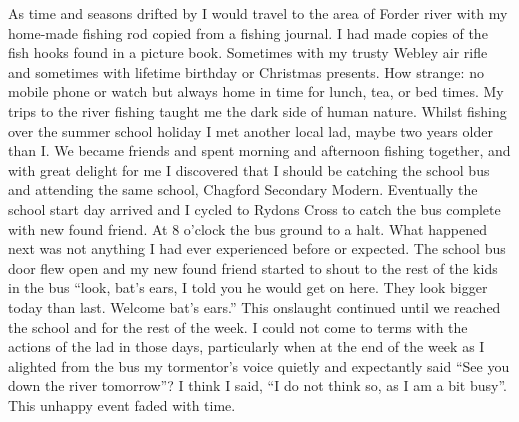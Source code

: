 As time and seasons drifted by I would travel to the area of Forder river with
my home-made fishing rod copied from a fishing journal. I had made copies of
the fish hooks found in a picture book. Sometimes with my trusty Webley air
rifle and sometimes with lifetime birthday or Christmas presents. How strange:
no mobile phone or watch but always home in time for lunch, tea, or bed times.
My trips to the river fishing taught me the dark side of human nature. Whilst
fishing over the summer school holiday I met another local lad, maybe two years
older than I. We became friends and spent morning and afternoon fishing
together, and with great delight for me I discovered that I should be catching
the school bus and attending the same school, Chagford Secondary Modern.
Eventually the school start day arrived and I cycled to Rydons Cross to catch
the bus complete with new found friend. At 8 o'clock the bus ground to a halt.
What happened next was not anything I had ever experienced before or expected.
The school bus door flew open and my new found friend started to shout to the
rest of the kids in the bus ``look, bat's ears, I told you he would get on
here. They look bigger today than last. Welcome bat's ears.'' This onslaught
continued until we reached the school and for the rest of the week. I could not
come to terms with the actions of the lad in those days, particularly when at
the end of the week as I alighted from the bus my tormentor's voice quietly and
expectantly said ``See you down the river tomorrow''? I think I said, ``I do
not think so, as I am a bit busy''. This unhappy event faded with time.

